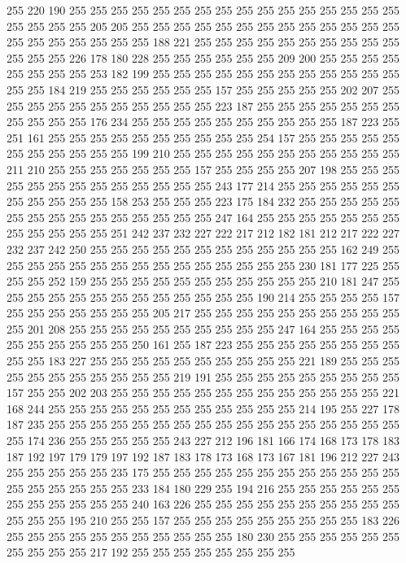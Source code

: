255 220 190 255 255 255 255 255 255 255 255 255 255 255 255 255 255 255 255 255
255 255 255 205 205 255 255 255 255 255 255 255 255 255 255 255 255 255 255 255
255 255 255 255 255 188 221 255 255 255 255 255 255 255 255 255 255 255 255 255
226 178 180 228 255 255 255 255 255 255 209 200 255 255 255 255 255 255 255 255
253 182 199 255 255 255 255 255 255 255 255 255 255 255 255 255 255 184 219 255
255 255 255 255 255 157 255 255 255 255 255 202 207 255 255 255 255 255 255 255
255 255 255 255 223 187 255 255 255 255 255 255 255 255 255 255 255 176 234 255
255 255 255 255 255 255 255 255 255 187 223 255 251 161 255 255 255 255 255 255
255 255 255 255 254 157 255 255 255 255 255 255 255 255 255 255 255 199 210 255
255 255 255 255 255 255 255 255 255 255 211 210 255 255 255 255 255 255 255 157
255 255 255 255 207 198 255 255 255 255 255 255 255 255 255 255 255 255 255 243
177 214 255 255 255 255 255 255 255 255 255 255 255 158 253 255 255 255 223 175
184 232 255 255 255 255 255 255 255 255 255 255 255 255 255 255 255 247 164 255
255 255 255 255 255 255 255 255 255 255 255 251 242 237 232 227 222 217 212 182
181 212 217 222 227 232 237 242 250 255 255 255 255 255 255 255 255 255 255 255
255 162 249 255 255 255 255 255 255 255 255 255 255 255 255 255 255 255 230 181
177 225 255 255 255 252 159 255 255 255 255 255 255 255 255 255 255 255 210 181
247 255 255 255 255 255 255 255 255 255 255 255 255 255 190 214 255 255 255 255
157 255 255 255 255 255 255 255 205 217 255 255 255 255 255 255 255 255 255 255
255 201 208 255 255 255 255 255 255 255 255 255 255 247 164 255 255 255 255 255
255 255 255 255 255 250 161 255 187 223 255 255 255 255 255 255 255 255 255 255
183 227 255 255 255 255 255 255 255 255 255 255 221 189 255 255 255 255 255 255
255 255 255 255 255 219 191 255 255 255 255 255 255 255 255 255 157 255 255 202
203 255 255 255 255 255 255 255 255 255 255 255 255 255 221 168 244 255 255 255
255 255 255 255 255 255 255 255 255 214 195 255 227 178 187 235 255 255 255 255
255 255 255 255 255 255 255 255 255 255 255 255 255 255 174 236 255 255 255 255
255 243 227 212 196 181 166 174 168 173 178 183 187 192 197 179 179 197 192 187
183 178 173 168 173 167 181 196 212 227 243 255 255 255 255 255 235 175 255 255
255 255 255 255 255 255 255 255 255 255 255 255 255 255 255 255 233 184 180 229
255 194 216 255 255 255 255 255 255 255 255 255 255 255 255 240 163 226 255 255
255 255 255 255 255 255 255 255 255 255 255 195 210 255 255 157 255 255 255 255
255 255 255 255 255 183 226 255 255 255 255 255 255 255 255 255 255 255 180 230
255 255 255 255 255 255 255 255 255 255 217 192 255 255 255 255 255 255 255 255
